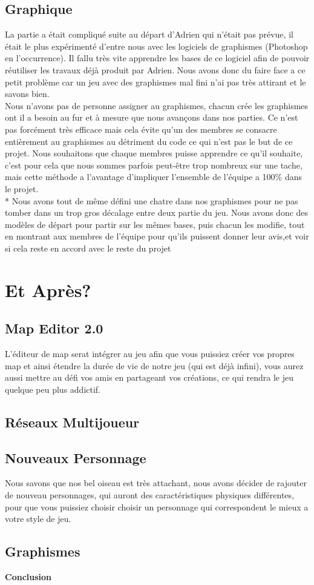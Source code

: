 \documentclass [11pt]{report}
\begin{document}
	\section{Graphique}
	La partie a était compliqué suite au départ d'Adrien qui n'était pas prévue, il était le plus expérimenté d'entre nous avec les logiciels de graphismes (Photoshop en l'occurrence). Il fallu très vite apprendre les bases de ce logiciel afin de pouvoir réutiliser les travaux déjà produit par Adrien. Nous avons donc du faire face a ce petit problème car un jeu avec des graphismes mal fini n'ai pas très attirant et le savons bien.\\
	\indent Nous n'avons pas de personne assigner au graphismes, chacun crée les graphismes ont il a besoin au fur et à mesure que nous avançons dans nos parties. Ce n'est pas forcément très efficace mais cela évite qu'un des membres se consacre entièrement au graphismes au détriment du code ce qui n'est pas le but de ce projet. Nous souhaitons que chaque membres puisse apprendre ce qu'il souhaite, c'est pour cela que nous sommes parfois peut-être trop nombreux sur une tache, mais cette méthode a l'avantage d'impliquer l'ensemble de l'équipe a 100\% dans le projet.\\*
	\indent Nous avons tout de même défini une chatre dans nos graphismes pour ne pas tomber dans un trop gros décalage entre deux partie du jeu. Nous avons donc des modèles de départ pour partir sur les mêmes bases, puis chacun les modifie, tout en montrant aux membres de l'équipe pour qu'ils puissent donner leur avis,et voir si cela reste en accord avec le reste du projet
\chapter{Et Après?}
	\section{Map Editor 2.0}
	L'éditeur de map serat intégrer au jeu afin que vous puissiez créer vos propres map et ainsi étendre la durée de vie de notre jeu (qui est déjà infini), vous aurez aussi mettre au défi vos amis en partageant vos créations, ce qui rendra le jeu quelque peu plus addictif.
	\section{Réseaux Multijoueur}

	\section{Nouveaux Personnage}
	Nous savons que nos bel oiseau est très attachant, nous avons décider de rajouter de nouveau personnages, qui auront des caractéristiques physiques différentes, pour que vous puissiez choisir choisir un personnage qui correspondent le mieux a votre style de jeu.
	\section{Graphismes}
\newpage
\textbf{{\huge Conclusion}}
\end{document}

